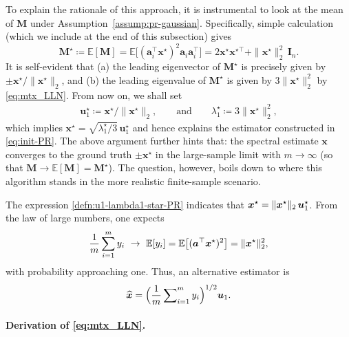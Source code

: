To explain the rationale of this approach, it is instrumental
to look at the mean of $\bm{M}$ under Assumption~\ref{assump:pr-gaussian}.
Specifically, simple calculation (which we include at the end of this subsection) gives
%
\begin{equation}
	\bm{M}^{\star}\coloneqq \mathbb{E}[\bm{M}] = \mathbb{E}\big[(\bm{a}_{i}^{\top}\bm{x}^{\star})^{2}\bm{a}_{i}\bm{a}_{i}^{\top}\big]=2\bm{x}^{\star}\bm{x}^{\star\top}+\|\bm{x}^{\star}\|_{2}^{2}\,\bm{I}_{n}.
	\label{eq:mtx_LLN}
\end{equation}
%
It is self-evident that (a) the leading eigenvector of $\bm{M}^{\star}$ is precisely given by $\pm \bm{x}^{\star} / \|\bm{x}^{\star} \|_2$, and (b) the leading eigenvalue of $\bm{M}^{\star}$ is given by $3\|\bm{x}^{\star}\|_{2}^{2}$ by \eqref{eq:mtx_LLN}.
From now on, we shall set
%
\begin{align}
	\bm{u}_{1}^{\star} \coloneqq \bm{x}^{\star} / \|\bm{x}^{\star} \|_2,
	\qquad \text{and} \qquad
	\lambda_1^{\star} \coloneqq 3\|\bm{x}^{\star}\|_{2}^{2},
	\label{defn:u1-lambda1-star-PR}
\end{align}
%
which implies $\bm{x}^{\star} = \sqrt{\lambda_1^\star/3} \,\bm{u}_{1}^{\star}$ and hence explains the estimator constructed in \eqref{eq:init-PR}.
The above argument further hints that: the spectral estimate $\bm{x}$ converges to the ground truth $\pm \bm{x}^{\star}$ in the large-sample limit with $m\rightarrow \infty$ (so that $\bm{M}\rightarrow \mathbb{E}[\bm{M}] =\bm{M}^{\star}$). The question, however, boils down to  where this algorithm stands in the more realistic finite-sample scenario.
%
\begin{remark}
The expression \eqref{defn:u1-lambda1-star-PR} indicates that $\bm{x}^{\star} =  \|\bm{x}^{\star} \|_2\,  {\boldsymbol u}_1^\star$.
From the law of large numbers, one expects
$$
	\frac{1}{m} \sum_{i=1}^m y_i  ~\to~   \mathbb{E}[ y_i] = \mathbb {E} \big[ ({\boldsymbol a}^{\top} {\boldsymbol x}^\star )^2 \big] =   \|  {\boldsymbol x}^\star\|^2_2,
$$
with probability approaching one.
Thus, an alternative estimator is
%
\begin{equation}
	\label{eq3.43}
	\widehat{{\boldsymbol x}} =  \Big( \frac{1}{m} \sum\nolimits_{i=1}^m y_i  \Big)^{1/2} {\boldsymbol u}_1.
\end{equation}
%
\end{remark}





\paragraph{Derivation of \eqref{eq:mtx_LLN}.}

